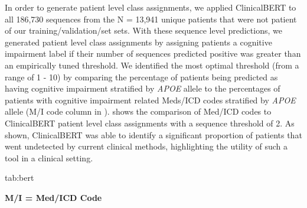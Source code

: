 \documentclass[pmlr,twocolumn,10pt]{jmlr} %
\begin{document}
In order to generate patient level class assignments, we applied ClinicalBERT to all 186,730 sequences from the N = 13,941 unique patients that were not patient of our training/validation/set sets. With these sequence level predictions, we generated patient level class assignments by assigning patients a cognitive impairment label if their number of sequences predicted positive was greater than an empirically tuned threshold. We identified the most optimal threshold (from a range of 1 - 10) by comparing the percentage of patients being predicted as having cognitive impairment stratified by \textit{APOE} allele to the percentages of patients with cognitive impairment related Meds/ICD codes stratified by \textit{APOE} allele (M/I code column in ).  shows the comparison of Med/ICD codes to ClinicalBERT patient level class assignments with a sequence threshold of 2. As shown, ClinicalBERT was able to identify a significant proportion of patients that went undetected by current clinical methods, highlighting the utility of such a tool in a clinical setting. 

\begin{table}[htb]
\floatconts
{tab:bert}
{\caption{Comparison between Other Indicators of Cognitive Impairment and ClinicalBERT}}
\centering
{}

\bfseries M/I = Med/ICD Code 
\end{table}
\end{document}
